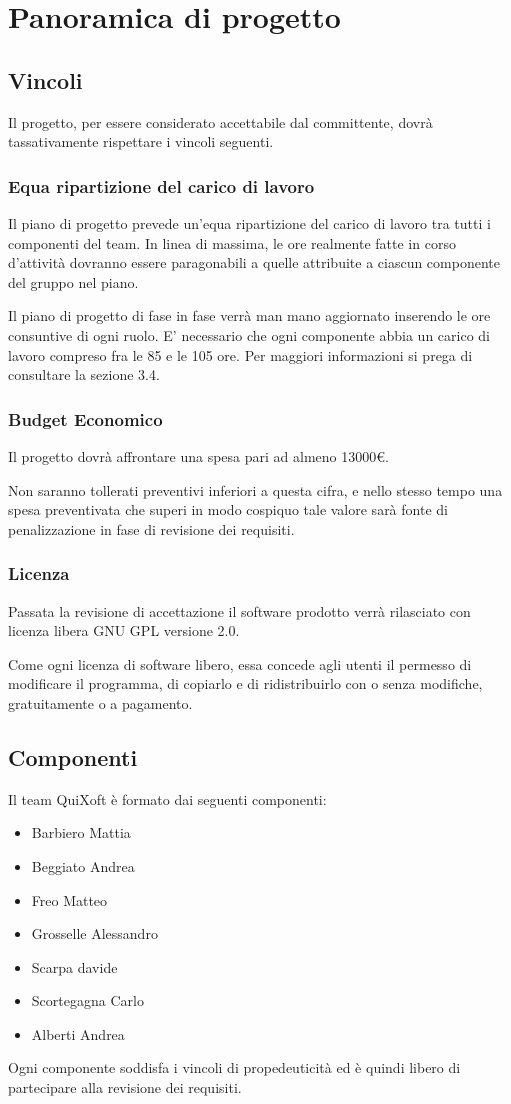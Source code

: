 \documentclass[11pt,a4paper]{article}
\begin{document}
\section{Panoramica di progetto}
\subsection{Vincoli}
Il progetto, per essere considerato accettabile dal committente, dovrà tassativamente rispettare i vincoli seguenti.
\subsubsection{Equa ripartizione del carico di lavoro}
Il piano di progetto prevede un'equa ripartizione del carico di lavoro tra tutti i componenti del team.
In linea di massima, le ore realmente fatte in corso d'attività dovranno essere paragonabili a quelle attribuite a ciascun componente del gruppo nel piano.

Il piano di progetto di fase in fase verrà man mano aggiornato inserendo le ore consuntive di ogni ruolo.
E' necessario che ogni componente abbia un carico di lavoro compreso fra le 85 e le 105 ore. Per maggiori informazioni si prega di consultare la sezione 3.4.
\subsubsection{Budget Economico}
Il progetto dovrà affrontare una spesa pari ad almeno 13000\euro.

Non saranno tollerati preventivi inferiori a questa cifra, e nello stesso tempo una spesa preventivata che superi in modo cospiquo tale valore sarà fonte di penalizzazione in fase di revisione dei requisiti.
\subsubsection{Licenza}
Passata la revisione di accettazione il software prodotto verrà rilasciato con licenza libera GNU GPL versione 2.0.

Come ogni licenza di software libero, essa concede agli utenti il permes\-so di modificare il programma, di copiarlo e di ridistribuirlo con o senza modifiche, gratuitamente o a pagamento.
\subsection{Componenti}
Il team QuiXoft è formato dai seguenti componenti:
\begin{itemize}
\item Barbiero Mattia
\item Beggiato Andrea
\item Freo Matteo
\item Grosselle Alessandro
\item Scarpa davide
\item Scortegagna Carlo
\item Alberti Andrea
\end{itemize}
Ogni componente soddisfa i vincoli di propedeuticità ed è quindi libero di partecipare alla revisione dei requisiti.
\end{document}
